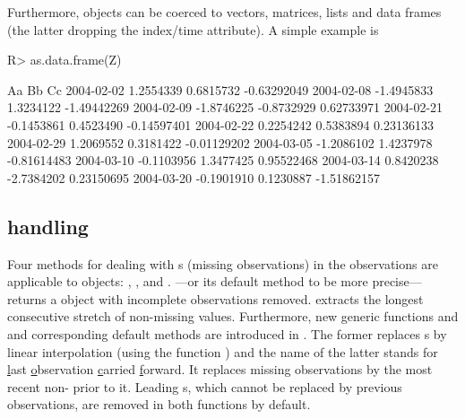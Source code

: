 \documentclass{Z}
\begin{document}
Furthermore,  objects can be coerced to vectors, matrices, lists and
data frames (the latter dropping the index/time attribute). A simple example is
\begin{Schunk}
\begin{Sinput}
R> as.data.frame(Z)
\end{Sinput}
\begin{Soutput}
                   Aa         Bb          Cc
2004-02-02  1.2554339  0.6815732 -0.63292049
2004-02-08 -1.4945833  1.3234122 -1.49442269
2004-02-09 -1.8746225 -0.8732929  0.62733971
2004-02-21 -0.1453861  0.4523490 -0.14597401
2004-02-22  0.2254242  0.5383894  0.23136133
2004-02-29  1.2069552  0.3181422 -0.01129202
2004-03-05 -1.2086102  1.4237978 -0.81614483
2004-03-10 -0.1103956  1.3477425  0.95522468
2004-03-14  0.8420238 -2.7384202  0.23150695
2004-03-20 -0.1901910  0.1230887 -1.51862157
\end{Soutput}
\end{Schunk}


\subsection[NA handling]{ handling}
\label{sec:NA}

Four methods for dealing with s (missing observations) 
in the observations are applicable to  objects:
, ,  and .
---or its default method to be more precise---returns a 
object with incomplete observations removed. 
extracts the longest consecutive stretch of non-missing values.
Furthermore, new generic functions
 and  and corresponding default methods are introduced in .
The former replaces s by linear interpolation (using the
function ) and the name of the latter
stands for \underline{l}ast \underline{o}bservation \underline{c}arried
\underline{f}orward. It replaces missing observations by the most recent
non- prior to it. Leading s, which cannot be replaced
by previous observations, are removed in both functions by default.
\end{document}
